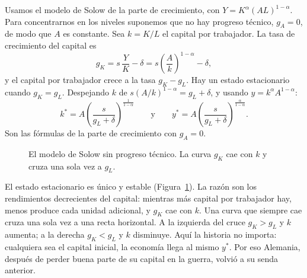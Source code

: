 \documentclass[12pt,letterpaper]{article}
\newcommand{\palfa}{0.3333}  %
\newcommand{\pdel}{0.05}     %
\newcommand{\pgL}{0.02}      %
\newcommand{\ps}{0.2}        %
\newcommand{\pAuno}{1}       %
\begin{document}
Usamos el modelo de Solow de la parte de crecimiento, con $Y=K^{\alpha}(AL)^{1-\alpha}$. Para concentrarnos en los niveles suponemos que no hay progreso técnico, $g_A=0$, de modo que $A$ es constante. Sea $k=K/L$ el capital por trabajador. La tasa de crecimiento del capital es
\begin{equation}\label{eq:gK}
  g_K=s\,\frac{Y}{K}-\delta=s\left(\frac{A}{k}\right)^{1-\alpha}-\delta ,
\end{equation}
y el capital por trabajador crece a la tasa $g_K-g_L$. Hay un estado estacionario cuando $g_K=g_L$. Despejando $k$ de $s\left(A/k\right)^{1-\alpha}=g_L+\delta$, y usando $y=k^{\alpha}A^{1-\alpha}$:
\begin{equation}\label{eq:ee}
  k^*=A\left(\frac{s}{g_L+\delta}\right)^{\frac{1}{1-\alpha}}
  \qquad\text{y}\qquad
  y^*=A\left(\frac{s}{g_L+\delta}\right)^{\frac{\alpha}{1-\alpha}} .
\end{equation}
Son las fórmulas de la parte de crecimiento con $g_A=0$.

\begin{figure}[htb]
\centering
{}
\caption{El modelo de Solow sin progreso técnico. La curva $g_K$ cae con $k$ y cruza una sola vez a $g_L$.}
\label{fig:solow}
\end{figure}

El estado estacionario es único y estable (Figura~\ref{fig:solow}). La razón son los rendimientos decrecientes del capital: mientras más capital por trabajador hay, menos produce cada unidad adicional, y $g_K$ cae con $k$. Una curva que siempre cae cruza una sola vez a una recta horizontal. A la izquierda del cruce $g_K>g_L$ y $k$ aumenta; a la derecha $g_K<g_L$ y $k$ disminuye. Aquí la historia no importa: cualquiera sea el capital inicial, la economía llega al mismo $y^*$. Por eso Alemania, después de perder buena parte de su capital en la guerra, volvió a su senda anterior.
\end{document}
